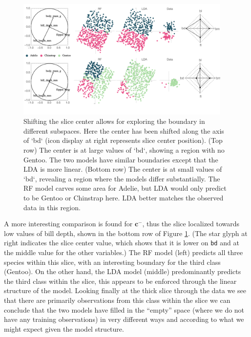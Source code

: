 \documentclass[]{interact}
\theoremstyle{plain}%
\theoremstyle{definition}
\theoremstyle{remark}
\begin{document}
\begin{figure}[ht]
\centerline{\includegraphics[width=0.95\textwidth]{figures/slice1_p.pdf}}
\caption{Shifting the slice center allows for exploring the boundary in different subspaces. Here the center has been shifted along the axis of `bd` (icon display at right represents slice center position). (Top row) The center is at large values of `bd`, showing a region with no Gentoo. The two models have similar boundaries except that the LDA is more linear. (Bottom row) The center is at small values of `bd`, revealing a region where the models differ substantially. The RF model carves some area for Adelie, but LDA would only predict to be Gentoo or Chinstrap here. LDA better matches the observed data in this region.}
\label{slice1p}
\end{figure}

A more interesting comparison is found for \(\mathbf{c}^{-}\), thus the
slice localized towards low values of bill depth, shown in the bottom
row of Figure \ref{slice1p}. (The star glyph at right indicates the
slice center value, which shows that it is lower on \texttt{bd} and at
the middle value for the other variables.) The RF model (left) predicts
all three species within this slice, with an interesting boundary for
the third class (Gentoo). On the other hand, the LDA model (middle)
predominantly predicts the third class within the slice, this appears to
be enforced through the linear structure of the model. Looking finally
at the thick slice through the data we see that there are primarily
observations from this class within the slice we can conclude that the
two models have filled in the ``empty'' space (where we do not have any
training observations) in very different ways and according to what we
might expect given the model structure.
\end{document}
